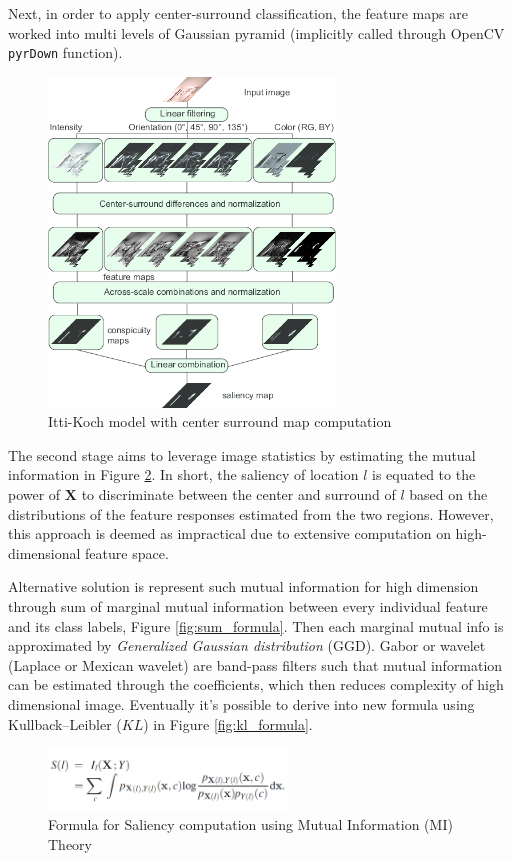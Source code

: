 \documentclass[conference]{IEEEtran}
\begin{document}
Next, in order to apply center-surround classification, the feature maps are worked into multi levels of Gaussian pyramid (implicitly called through OpenCV \texttt{pyrDown} function).
 
\begin{figure}[h]
    \centering
    \includegraphics[width=3in]{itti.png}
    \caption{Itti-Koch model with center surround map computation}
    \label{fig:itti}
\end{figure}

The second stage aims to leverage image statistics by estimating the mutual information in Figure \ref{fig:mi_formula}. In short, the saliency of location $l$ is equated to the power of $\textbf{X}$ to discriminate between the center and surround of $l$ based on the distributions of the feature responses estimated from the two regions. However, this approach is deemed as impractical due to extensive computation on high-dimensional feature space. 

Alternative solution is represent such mutual information for high dimension through sum of marginal mutual information between every individual feature and its class labels, Figure \ref{fig:sum_formula}. Then each marginal mutual info is approximated by \textit{Generalized Gaussian distribution} (GGD). Gabor or wavelet (Laplace or Mexican wavelet) are band-pass filters such that mutual information can be estimated through the coefficients, which then reduces complexity of high dimensional image. Eventually it's possible to derive into new formula using Kullback–Leibler ($KL$) in Figure \ref{fig:kl_formula}.

\begin{figure}[h]
    \centering
    \includegraphics[width=2.5in]{MI.png}
    \caption{Formula for Saliency computation using Mutual Information (MI) Theory}
    \label{fig:mi_formula}
\end{figure}
  
\end{document}
